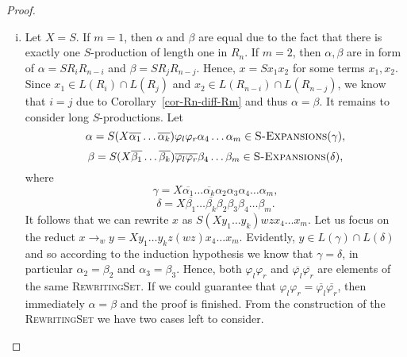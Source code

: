 \documentclass[11pt,a4paper]{amsart}
\theoremstyle{definition}
\newcommand{\SExpansions}[1]{\textsc{S-Expansions}(#1)}
\begin{document}
\begin{proof}
\begin{enumerate}[(i)]
        \item Let $X = S$. If $m = 1$, then $\alpha$ and $\beta$ are equal due to
                the fact that there is exactly one $S$-production of length one
                in $R_n$. If $m = 2$, then $\alpha,\beta$ are in form of $\alpha
                = S R_i R_{n-i}$ and $\beta = S R_j R_{n-j}$. Hence, $x = S x_1
                x_2$ for some terms $x_1,x_2$. Since $x_1 \in L(R_i) \cap
                L(R_j)$ and $x_2 \in L(R_{n-i}) \cap L(R_{n-j})$, we know that
                $i = j$ due to Corollary~\ref{cor-Rn-diff-Rm} and thus $\alpha =
                \beta$. It remains to consider long $S$-productions. Let
                \[ \alpha = S (X \overline{\alpha_1} \ldots \overline{\alpha_k}) \varphi_l
                        \varphi_r \alpha_4
                    \ldots \alpha_m \in \SExpansions{\gamma},\]
                    \[ \beta = S (X \overline{\beta_1} \ldots \overline{\beta_k})
                            \overline{\varphi_l} \overline{\varphi_r} \beta_4
                    \ldots \beta_m \in \SExpansions{\delta},\]
                where
                \[ \gamma = X \overline{\alpha_1} \ldots \overline{\alpha_k} \alpha_2
                \alpha_3 \alpha_4 \ldots \alpha_m, \]
                \[ \delta = X \overline{\beta_1} \ldots \overline{\beta_k} \beta_2
                \beta_3 \beta_4 \ldots \beta_m. \]
                It follows that we can rewrite $x$ as $S (X y_1 \ldots y_k) w z
                x_4 \ldots x_m$. Let us focus on the reduct $x \to_w y = X y_1
                \ldots y_k z (w z) x_4 \ldots x_m$. Evidently, $y \in L(\gamma)
                \cap L(\delta)$ and so according to the induction hypothesis we
                know that $\gamma = \delta$, in particular $\alpha_2 = \beta_2$
                and $\alpha_3 = \beta_3$. Hence, both $\varphi_l \varphi_r$ and
                $\overline{\varphi_l}\overline{\varphi_r}$ are elements of the same
                \textsc{RewritingSet}. If we could guarantee that $\varphi_l
                \varphi_r = \overline{\varphi_l}\overline{\varphi_r}$, then immediately
                $\alpha = \beta$ and the proof is finished.  From the
                construction of the \textsc{RewritingSet} we have two cases left to
                consider.
\end{enumerate}
\end{proof}
\end{document}
